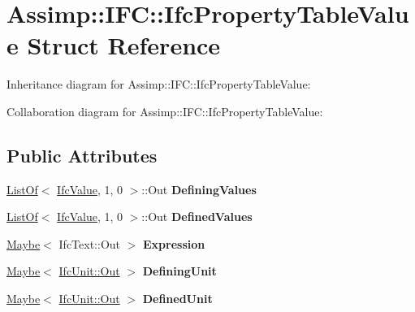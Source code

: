 \hypertarget{struct_assimp_1_1_i_f_c_1_1_ifc_property_table_value}{\section{Assimp\+:\+:I\+F\+C\+:\+:Ifc\+Property\+Table\+Value Struct Reference}
\label{struct_assimp_1_1_i_f_c_1_1_ifc_property_table_value}
}


Inheritance diagram for Assimp\+:\+:I\+F\+C\+:\+:Ifc\+Property\+Table\+Value\+:


Collaboration diagram for Assimp\+:\+:I\+F\+C\+:\+:Ifc\+Property\+Table\+Value\+:
\subsection*{Public Attributes}
\begin{DoxyCompactItemize}
\item 
\hypertarget{struct_assimp_1_1_i_f_c_1_1_ifc_property_table_value_ad2787333255f5615e426823be5900321}{\hyperlink{struct_assimp_1_1_s_t_e_p_1_1_list_of}{List\+Of}$<$ \hyperlink{class_assimp_1_1_s_t_e_p_1_1_e_x_p_r_e_s_s_1_1_data_type}{Ifc\+Value}, 1, 0 $>$\+::Out {\bfseries Defining\+Values}}\label{struct_assimp_1_1_i_f_c_1_1_ifc_property_table_value_ad2787333255f5615e426823be5900321}

\item 
\hypertarget{struct_assimp_1_1_i_f_c_1_1_ifc_property_table_value_aa9fcf85c35d9ea11cef24de76081cc95}{\hyperlink{struct_assimp_1_1_s_t_e_p_1_1_list_of}{List\+Of}$<$ \hyperlink{class_assimp_1_1_s_t_e_p_1_1_e_x_p_r_e_s_s_1_1_data_type}{Ifc\+Value}, 1, 0 $>$\+::Out {\bfseries Defined\+Values}}\label{struct_assimp_1_1_i_f_c_1_1_ifc_property_table_value_aa9fcf85c35d9ea11cef24de76081cc95}

\item 
\hypertarget{struct_assimp_1_1_i_f_c_1_1_ifc_property_table_value_ad831ee0a6cbb62dc145f2ce64fa0365c}{\hyperlink{struct_assimp_1_1_s_t_e_p_1_1_maybe}{Maybe}$<$ Ifc\+Text\+::\+Out $>$ {\bfseries Expression}}\label{struct_assimp_1_1_i_f_c_1_1_ifc_property_table_value_ad831ee0a6cbb62dc145f2ce64fa0365c}

\item 
\hypertarget{struct_assimp_1_1_i_f_c_1_1_ifc_property_table_value_aad53d6ede0203674b8151d247fb1a8d8}{\hyperlink{struct_assimp_1_1_s_t_e_p_1_1_maybe}{Maybe}$<$ \hyperlink{classboost_1_1shared__ptr}{Ifc\+Unit\+::\+Out} $>$ {\bfseries Defining\+Unit}}\label{struct_assimp_1_1_i_f_c_1_1_ifc_property_table_value_aad53d6ede0203674b8151d247fb1a8d8}

\item 
\hypertarget{struct_assimp_1_1_i_f_c_1_1_ifc_property_table_value_a174f3eabdebe2bb3f0edf6cc4d9c8ccf}{\hyperlink{struct_assimp_1_1_s_t_e_p_1_1_maybe}{Maybe}$<$ \hyperlink{classboost_1_1shared__ptr}{Ifc\+Unit\+::\+Out} $>$ {\bfseries Defined\+Unit}}\label{struct_assimp_1_1_i_f_c_1_1_ifc_property_table_value_a174f3eabdebe2bb3f0edf6cc4d9c8ccf}

\end{DoxyCompactItemize}
